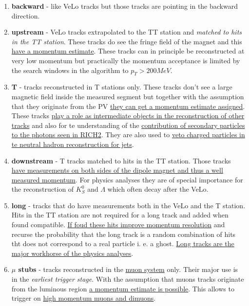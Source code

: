 \documentclass[11pt,a4paper,twoside]{article}
\begin{document}
\begin{enumerate}
\begin{enumerate}
            \item \textbf{backward} - like VeLo tracks but those tracks are pointing in the backward direction.
            
            \item \textbf{upstream} - VeLo tracks extrapolated to the TT station and \textit{matched to hits in the TT station}. These tracks do see the fringe field of the magnet and this \underline{have a momentum estimate}. These tracks can in principle be reconstructed at very low momentum but practically the momentum acceptance is limited by the search windows in the algorithm to $p_T > 200 MeV$.
            
            \item \textbf{T} - tracks reconstructed in T stations only. These tracks don't see a large magnetic field inside the measured segment but together with the assumption that they originate from the PV \underline{they can get a momentum estimate assigned}. These tracks \underline{play a role as intermediate objects in the reconstruction of other tracks} and also for te understanding of the \underline{contribution of secondary particles to the photons seen in RICH2}. They are also used to \underline{veto charged particles in te neutral hadron reconstruction for jets}.
            
            \item \textbf{downstream} - T tracks matched to hits in the TT station. Those tracks \underline{have measurements on both sides of the dipole magnet and thus a well measured momentum}. For physics analyses they are of special importance for the reconstruction of $K^{0}_{S}$ and $\Lambda$ which often decay after the VeLo.
            
            \item \textbf{long} - tracks that do have measurements both in the VeLo and the T station. Hits in the TT station are not required for a long track and added when found compatible. \underline{If foud these hits improve momentum resolution} and recurse the probability that the long track is a random combination of hits tht does not correspond to a real particle i. e. a ghost. \underline{Long tracks are the major workhorse of the physics analyses}.
            
            \item \textbf{$\mu$ stubs} - tracks reconstructed in the \underline{muon system} only. Their major use is in the \textit{earliest trigger stage}. With the assumption that muons tracks originate from the luminous region \underline{a momentum estimate is possible}. This allows to trigger on \underline{high momentum muons and dimuons}.
            

\end{enumerate}
\end{enumerate}
\end{document}
